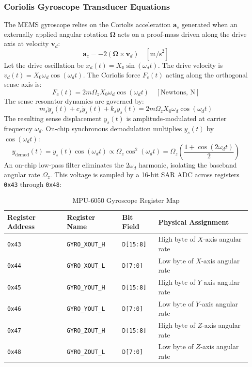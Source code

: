 \documentclass[11pt, a4paper]{article}
\begin{document}
\subsubsection{Coriolis Gyroscope Transducer Equations}
The MEMS gyroscope relies on the Coriolis acceleration $\mathbf{a}_c$ generated when an externally applied angular rotation $\boldsymbol{\Omega}$ acts on a proof-mass driven along the drive axis at velocity $\mathbf{v}_d$:
\begin{equation}
    \mathbf{a}_c = -2 (\boldsymbol{\Omega} \times \mathbf{v}_d) \quad [\text{m/s}^2]
\end{equation}
Let the drive oscillation be $x_d(t) = X_0 \sin(\omega_d t)$. The drive velocity is $v_d(t) = X_0 \omega_d \cos(\omega_d t)$. The Coriolis force $F_c(t)$ acting along the orthogonal sense axis is:
\begin{equation}
    F_c(t) = 2 m \Omega_z X_0 \omega_d \cos(\omega_d t) \quad [\text{Newtons, N}]
\end{equation}
The sense resonator dynamics are governed by:
\begin{equation}
    m_s \ddot{y}_s(t) + c_s \dot{y}_s(t) + k_s y_s(t) = 2 m \Omega_z X_0 \omega_d \cos(\omega_d t)
\end{equation}
The resulting sense displacement $y_s(t)$ is amplitude-modulated at carrier frequency $\omega_d$. On-chip synchronous demodulation multiplies $y_s(t)$ by $\cos(\omega_d t)$:
\begin{equation}
    y_{\text{demod}}(t) = y_s(t) \cos(\omega_d t) \propto \Omega_z \cos^2(\omega_d t) = \Omega_z \left(\frac{1 + \cos(2\omega_d t)}{2}\right)
\end{equation}
An on-chip low-pass filter eliminates the $2\omega_d$ harmonic, isolating the baseband angular rate $\Omega_z$. This voltage is sampled by a 16-bit SAR ADC across registers \texttt{0x43} through \texttt{0x48}:
\begin{table}[H]
\centering
\small
\begin{tabular}{llll}
\toprule
\textbf{Register Address} & \textbf{Register Name} & \textbf{Bit Field} & \textbf{Physical Assignment} \\
\midrule
\texttt{0x43} & \texttt{GYRO\_XOUT\_H} & \texttt{D[15:8]} & High byte of $X$-axis angular rate \\
\texttt{0x44} & \texttt{GYRO\_XOUT\_L} & \texttt{D[7:0]}  & Low byte of $X$-axis angular rate \\
\texttt{0x45} & \texttt{GYRO\_YOUT\_H} & \texttt{D[15:8]} & High byte of $Y$-axis angular rate \\
\texttt{0x46} & \texttt{GYRO\_YOUT\_L} & \texttt{D[7:0]}  & Low byte of $Y$-axis angular rate \\
\texttt{0x47} & \texttt{GYRO\_ZOUT\_H} & \texttt{D[15:8]} & High byte of $Z$-axis angular rate \\
\texttt{0x48} & \texttt{GYRO\_ZOUT\_L} & \texttt{D[7:0]}  & Low byte of $Z$-axis angular rate \\
\bottomrule
\end{tabular}
\caption{MPU-6050 Gyroscope Register Map}
\label{tab:gyro_reg_map}
\end{table}
\end{document}
